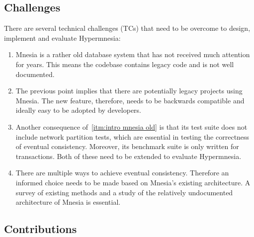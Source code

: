 \subsection{Challenges} \label{sec:intro challenges}

There are several technical challenges (TCs) that need to be overcome to design,
implement and evaluate Hypermnesia:

\begin{enumerate}[label={TC\arabic*.}, ref={TC\arabic*}]
  \item Mnesia is a rather old database system that has not received much attention for
  years. This means the codebase contains legacy code and is not well documented.
  \label{itm:intro mnesia old}
  \item The previous point implies that there are potentially legacy projects
  using Mnesia. The new feature, therefore, needs to be backwards compatible and 
  ideally easy to be adopted by developers.
  \item Another consequence of~\cref{itm:intro mnesia old} is that its test
  suite does not include network partition tests, which are essential in testing
  the correctness of eventual consistency. Moreover, its benchmark suite is only
  written for transactions. Both of these need to be extended to evaluate Hypermnesia.
  \item There are multiple ways to achieve eventual consistency. Therefore an
  informed choice needs to be made based on Mnesia's existing architecture. A survey 
  of existing methods and a study of the
  relatively undocumented architecture of Mnesia is essential.
\end{enumerate}


\subsection{Contributions} \label{sec:intro contributions}


